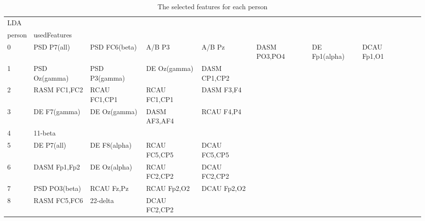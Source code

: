 \begin{landscape}
\begin{table}[]
\centering
\caption{The selected features for each person}
\begin{tabular}{l|llllllll}
LDA      &                &                &                &                &                &                &                &                &               &              \\
person   & usedFeatures   &                &                &                &                &                &                &                &               &              \\
0        & PSD P7(all)    & PSD FC6(beta)  & A/B P3         & A/B Pz         & DASM PO3,PO4   & DE Fp1(alpha)  & DCAU Fp1,O1    &                &               &              \\
1        & PSD Oz(gamma)  & PSD P3(gamma)  & DE Oz(gamma)   & DASM CP1,CP2   &                &                &                &                &               &              \\
2        & RASM FC1,FC2   & RCAU FC1,CP1   & RCAU FC1,CP1   & DASM F3,F4     &                &                &                &                &               &              \\
3        & DE F7(gamma)   & DE Oz(gamma)   & DASM AF3,AF4   & RCAU F4,P4     &                &                &                &                &               &              \\
4        & 11-beta        &                &                &                &                &                &                &                &               &              \\
5        & DE P7(all)     & DE F8(alpha)   & RCAU FC5,CP5   & DCAU FC5,CP5   &                &                &                &                &               &              \\
6        & DASM Fp1,Fp2   & DE Oz(alpha)   & RCAU FC2,CP2   & DCAU FC2,CP2   &                &                &                &                &               &              \\
7        & PSD PO3(beta)  & RCAU Fz,Pz     & RCAU Fp2,O2    & DCAU Fp2,O2    &                &                &                &                &               &              \\
8        & RASM FC5,FC6   & 22-delta       & DCAU FC2,CP2   &                &                &                &                &                &               &              \\

\end{tabular}
\end{table}
\end{landscape}
